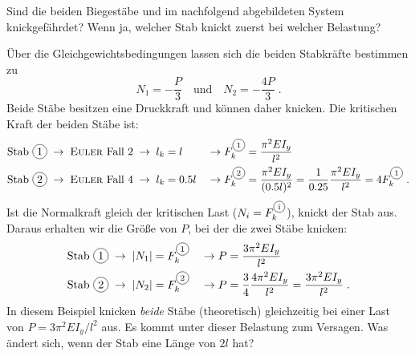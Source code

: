 \begin{example}
	Sind die beiden Biegestäbe  und  im nachfolgend abgebildeten System knickgefährdet?
	Wenn ja, welcher Stab knickt zuerst bei welcher Belastung?
	\begin{center}
		
	\end{center}
	Über die Gleichgewichtsbedingungen lassen sich die beiden Stabkräfte bestimmen zu
	\begin{equation}
		N_1 = -\dfrac{P}{3}\quad\text{und}\quad N_2 = -\dfrac{4P}{3} \; .
	\end{equation}
	Beide Stäbe besitzen eine Druckkraft und können daher knicken.
	Die kritischen Kraft der beiden Stäbe ist:
	\begin{equation}
		\begin{aligned}
		\text{Stab \circled{$1$}} \; &\rightarrow \; \text{\textsc{Euler} Fall 2} \;\rightarrow\;l_k=l \;&\rightarrow&\; F_k^{\text{\circled{$1$}}} = \dfrac{\pi^2EI_y}{l^2} \\
		\text{Stab \circled{$2$}} \; &\rightarrow \; \text{\textsc{Euler} Fall 4} \;\rightarrow\;l_k=0.5l \;&\rightarrow&\; F_k^{\text{\circled{$2$}}} = \dfrac{\pi^2EI_y}{(0.5l)^2}=\dfrac{1}{0.25}\dfrac{\pi^2EI_y}{l^2}=4F_k^{\text{\circled{$1$}}}\;.
		\end{aligned}
	\end{equation}
	Ist die Normalkraft gleich der kritischen Last ($N_i=F_k^{\text{\circled{i}}}$), knickt der Stab aus. Daraus erhalten wir die Größe von $P$, bei der die zwei Stäbe knicken:
	\begin{equation}
	\begin{aligned}
	\text{Stab \circled{$1$}} \; &\rightarrow \; \left|N_1\right|=F_k^{\text{\circled{$1$}}} \;&\rightarrow&\; P=\dfrac{3\pi^2EI_y}{l^2} \\
	\text{Stab \circled{$2$}} \; &\rightarrow \; \left|N_2\right|=F_k^{\text{\circled{$2$}}} \;&\rightarrow&\; P=\dfrac{3}{4}\dfrac{4\pi^2EI_y}{l^2}=\dfrac{3\pi^2EI_y}{l^2}\;.
	\end{aligned}
	\end{equation}
	In diesem Beispiel knicken \emph{beide} Stäbe (theoretisch) gleichzeitig bei einer Last von $P=3\pi^2EI_y/l^2$ aus.
	Es kommt unter dieser Belastung zum Versagen.
	Was ändert sich, wenn der Stab  eine Länge von $2l$ hat?
	\begin{center}
		
	\end{center}
\end{example}

